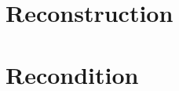 \chapter{Reconstruction}
\lipsum[3] %
\chapter{Recondition}
\lipsum[4] %
\begingroup
	\raggedright
	
\endgroup


